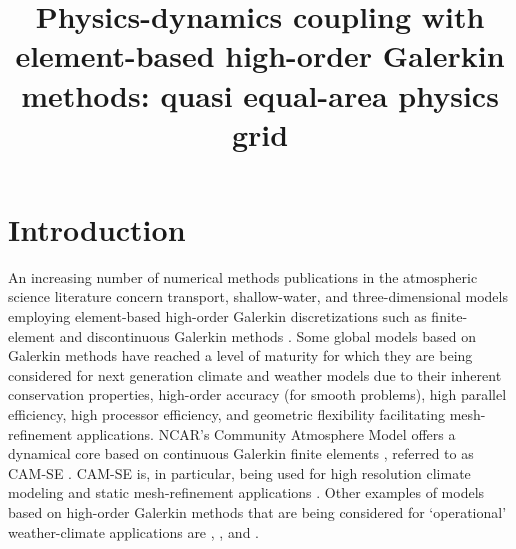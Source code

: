 \documentclass[twocol]{ametsoc}
\title{Physics-dynamics coupling with element-based high-order Galerkin methods: quasi equal-area physics grid}
\affiliation{School of Marine and Atmospheric Sciences, Stony Brook University, Stony Brook, New York, USA.}
\begin{document}
\maketitle


%

\section{Introduction}
An increasing number of numerical methods publications in the atmospheric science literature concern transport, shallow-water, and three-dimensional models employing element-based high-order Galerkin discretizations such as finite-element and discontinuous Galerkin methods \citep[for an introduction to these methods see, e.g., ][]{Durran,NLL2011LNCSE,U2014GMD}. Some global models based on Galerkin methods have reached a level of maturity for which they are being considered for next generation climate and weather models due to their inherent conservation properties, high-order accuracy (for smooth problems), high parallel efficiency, high processor efficiency, and geometric flexibility facilitating mesh-refinement applications. NCAR's Community Atmosphere Model \citep[CAM; ][]{CAM5} offers a dynamical core based on continuous Galerkin finite elements \citep{TF2010JCP}, referred to as CAM-SE \citep[CAM Spectral Elements; ][]{TES2008JPCS,DetAl2012IJHPCA,LetAl2018JAMES}. CAM-SE is, in particular, being used for high resolution climate modeling \citep[e.g., ][]{JAME:JAME20125,RetAl2015GRL,BETAL2018CC} and static mesh-refinement applications \citep[e.g., ][]{FT2004MWR,ZetAl2014JC,ZetAl2014JCb,GetAl2014GMD,RHUZ2016JAMC}. Other examples of models based on high-order Galerkin methods that are being considered for `operational' weather-climate applications are \citet{Giraldo20083849}, \citet{NCT2009CF}, \citet{BSBDK2013TCFD} and {}.
\end{document}
